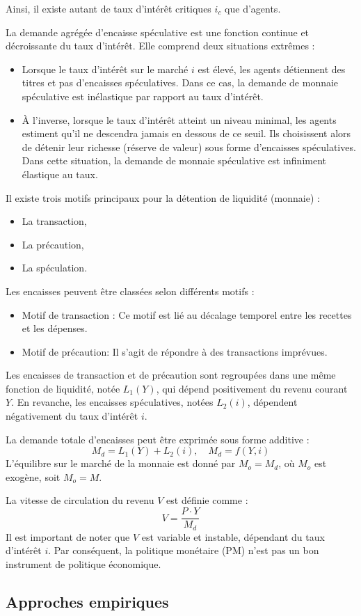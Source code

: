 \documentclass[a4paper, 12pt]{report}
\begin{document}
Ainsi, il existe autant de taux d'intérêt critiques \( i_c \) que d'agents.

La demande agrégée d'encaisse spéculative est une fonction continue et décroissante du taux d'intérêt. Elle comprend deux situations extrêmes :

\begin{itemize}
	\item Lorsque le taux d'intérêt sur le marché \( i \) est élevé, les agents détiennent des titres et pas d'encaisses spéculatives. Dans ce cas, la demande de monnaie spéculative est inélastique par rapport au taux d'intérêt.
	\item À l'inverse, lorsque le taux d'intérêt atteint un niveau minimal, les agents estiment qu'il ne descendra jamais en dessous de ce seuil. Ils choisissent alors de détenir leur richesse (réserve de valeur) sous forme d'encaisses spéculatives. Dans cette situation, la demande de monnaie spéculative est infiniment élastique au taux.
\end{itemize}

Il existe trois motifs principaux pour la détention de liquidité (monnaie) : 
\begin{itemize}
	\item La transaction,
	\item La précaution,
	\item La spéculation.
\end{itemize}

Les encaisses peuvent être classées selon différents motifs :

\begin{itemize}
	\item Motif de transaction : Ce motif est lié au décalage temporel entre les recettes et les dépenses.
	\item Motif de précaution: Il s'agit de répondre à des transactions imprévues.
\end{itemize}

Les encaisses de transaction et de précaution sont regroupées dans une même fonction de liquidité, notée \( L_1(Y) \), qui dépend positivement du revenu courant \( Y \). En revanche, les encaisses spéculatives, notées \( L_2(i) \), dépendent négativement du taux d'intérêt \( i \).

La demande totale d'encaisses peut être exprimée sous forme additive :
\[
M_d = L_1(Y) + L_2(i), \quad M_d = f(Y, i)
\]
L'équilibre sur le marché de la monnaie est donné par \( M_o = M_d \), où \( M_o \) est exogène, soit \( M_o = M \).

La vitesse de circulation du revenu \( V \) est définie comme :
\[
V = \frac{P \cdot Y}{M_d}
\]
Il est important de noter que \( V \) est variable et instable, dépendant du taux d'intérêt \( i \). Par conséquent, la politique monétaire (PM) n'est pas un bon instrument de politique économique.


	
\subsection{Approches empiriques}
	
	
	
	
	
\end{document}
